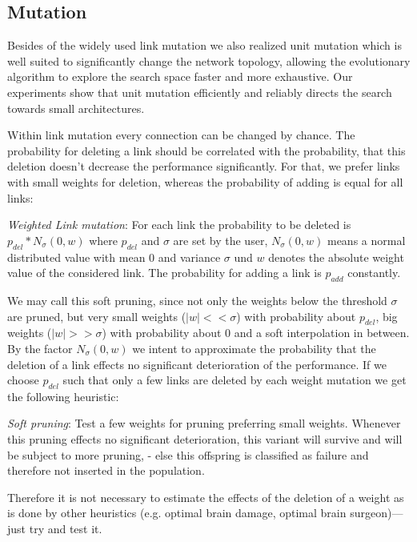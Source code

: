 \subsection {Mutation}

Besides of the widely used link mutation we also realized unit
mutation which is well suited to significantly change the network
topology, allowing the evolutionary algorithm to explore the search
space faster and more exhaustive. Our experiments show that unit
mutation efficiently and reliably directs the search towards small
architectures.

Within link mutation every connection can be changed
by chance. The probability for deleting a link should be correlated
with the probability, that this deletion doesn't decrease the
performance significantly.  For that, we prefer links with small
weights for deletion, whereas the probability of adding is equal for
all links:

{\em Weighted Link mutation}: For each link the probability to be
  deleted is $p_{del}*N_\sigma(0,w)$ where $p_{del}$ and $\sigma$ are
  set by the user, $N_\sigma(0,w)$ means a normal distributed value
  with mean $0$ and variance $\sigma$ und $w$ denotes the absolute
  weight value  of the considered link. The probability for
  adding a link is $p_{add}$ constantly.

We may call this soft pruning, since not only the weights below the
threshold $\sigma$ are pruned, but very small weights ($|w|<<\sigma$)
with probability about $p_{del}$, big weights ($|w|>>\sigma$) with
probability about 0 and a soft interpolation in between. By the factor $N_\sigma(0,w)$ we intent
to approximate the probability that the deletion of a link effects no
significant deterioration of the performance.  If we choose $p_{del}$
such that only a few links are deleted by each weight mutation we get
the following heuristic:

{\em Soft pruning}: Test a few weights for pruning preferring small
    weights.  Whenever this pruning effects no significant
    deterioration, this variant will survive and will be subject to
    more pruning, - else this offspring is classified as failure and
    therefore not inserted in the population.

Therefore it is not necessary to estimate the effects of the deletion
of a weight as is done by other heuristics (e.g.  optimal brain
damage, optimal brain surgeon)---just try and test it.

